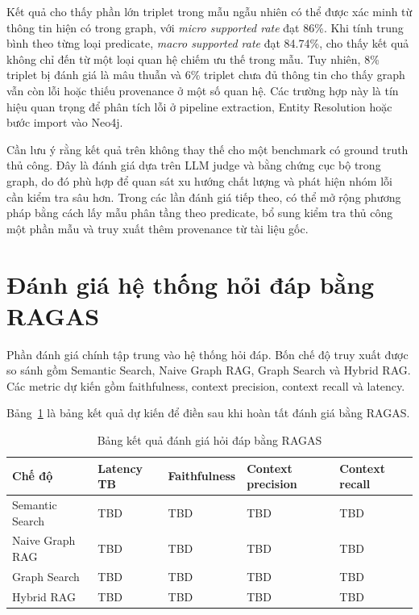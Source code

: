 Kết quả cho thấy phần lớn triplet trong mẫu ngẫu nhiên có thể được xác minh từ thông tin hiện có trong graph, với \textit{micro supported rate} đạt 86\%. Khi tính trung bình theo từng loại predicate, \textit{macro supported rate} đạt 84.74\%, cho thấy kết quả không chỉ đến từ một loại quan hệ chiếm ưu thế trong mẫu. Tuy nhiên, 8\% triplet bị đánh giá là mâu thuẫn và 6\% triplet chưa đủ thông tin cho thấy graph vẫn còn lỗi hoặc thiếu provenance ở một số quan hệ. Các trường hợp này là tín hiệu quan trọng để phân tích lỗi ở pipeline extraction, Entity Resolution hoặc bước import vào Neo4j.

Cần lưu ý rằng kết quả trên không thay thế cho một benchmark có ground truth thủ công. Đây là đánh giá dựa trên LLM judge và bằng chứng cục bộ trong graph, do đó phù hợp để quan sát xu hướng chất lượng và phát hiện nhóm lỗi cần kiểm tra sâu hơn. Trong các lần đánh giá tiếp theo, có thể mở rộng phương pháp bằng cách lấy mẫu phân tầng theo predicate, bổ sung kiểm tra thủ công một phần mẫu và truy xuất thêm provenance từ tài liệu gốc.

\section{Đánh giá hệ thống hỏi đáp bằng RAGAS}

Phần đánh giá chính tập trung vào hệ thống hỏi đáp. Bốn chế độ truy xuất được so sánh gồm Semantic Search, Naive Graph RAG, Graph Search và Hybrid RAG. Các metric dự kiến gồm faithfulness, context precision, context recall và latency.

Bảng~\ref{tab:ragas_results_placeholder} là bảng kết quả dự kiến để điền sau khi hoàn tất đánh giá bằng RAGAS.

\begin{table}[H]
\centering
\caption{Bảng kết quả đánh giá hỏi đáp bằng RAGAS}
\label{tab:ragas_results_placeholder}
\begin{tabularx}{\textwidth}{|p{}|p{}|p{}|p{}|X|}
\hline
\textbf{Chế độ} & \textbf{Latency TB} & \textbf{Faithfulness} & \textbf{Context precision} & \textbf{Context recall} \\
\hline
Semantic Search & TBD & TBD & TBD & TBD \\
\hline
Naive Graph RAG & TBD & TBD & TBD & TBD \\
\hline
Graph Search & TBD & TBD & TBD & TBD \\
\hline
Hybrid RAG & TBD & TBD & TBD & TBD \\
\hline
\end{tabularx}
\end{table}

